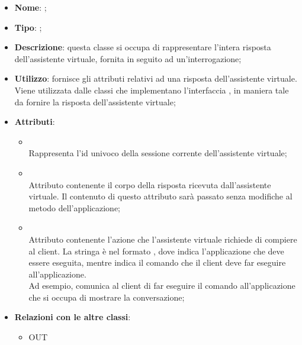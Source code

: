 \begin{itemize}
	\item \textbf{Nome}: ;
	\item \textbf{Tipo}: ;
	\item \textbf{Descrizione}: questa classe si occupa di rappresentare l'intera risposta dell'assistente virtuale, fornita in seguito ad un'interrogazione;
	\item \textbf{Utilizzo}: fornisce gli attributi relativi ad una risposta dell'assistente virtuale. Viene utilizzata dalle classi che implementano l'interfaccia , in maniera tale da fornire la risposta dell'assistente virtuale;
	\item \textbf{Attributi}:
	\begin{itemize}
		\item[]  \\
		Rappresenta l'id univoco della sessione corrente dell'assistente virtuale;
		\item[]  \\
		Attributo contenente il corpo della risposta ricevuta dall'assistente virtuale. Il contenuto di questo attributo sarà passato senza modifiche al metodo  dell'applicazione;
		\item[]  \\
		Attributo contenente l'azione che l'assistente virtuale richiede di compiere al client. La stringa è nel formato , dove  indica l'applicazione che deve essere eseguita, mentre  indica il comando che il client deve far eseguire all'applicazione. \\
Ad esempio,  comunica al client di far eseguire il comando  all'applicazione che si occupa di mostrare la conversazione;
	\end{itemize}
	\item \textbf{Relazioni con le altre classi}:
	\begin{itemize}
		\item OUT \hyperlink{ResponseBody_label}{}
	\end{itemize}
\end{itemize}
\FloatBarrier


